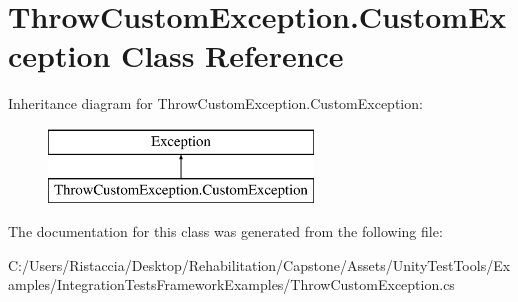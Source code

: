 \hypertarget{class_throw_custom_exception_1_1_custom_exception}{}\section{Throw\+Custom\+Exception.\+Custom\+Exception Class Reference}
\label{class_throw_custom_exception_1_1_custom_exception}
Inheritance diagram for Throw\+Custom\+Exception.\+Custom\+Exception\+:\begin{figure}[H]
\begin{center}
\leavevmode
\includegraphics[height=2.000000cm]{class_throw_custom_exception_1_1_custom_exception}
\end{center}
\end{figure}


The documentation for this class was generated from the following file\+:\begin{DoxyCompactItemize}
\item 
C\+:/\+Users/\+Ristaccia/\+Desktop/\+Rehabilitation/\+Capstone/\+Assets/\+Unity\+Test\+Tools/\+Examples/\+Integration\+Tests\+Framework\+Examples/Throw\+Custom\+Exception.\+cs\end{DoxyCompactItemize}
